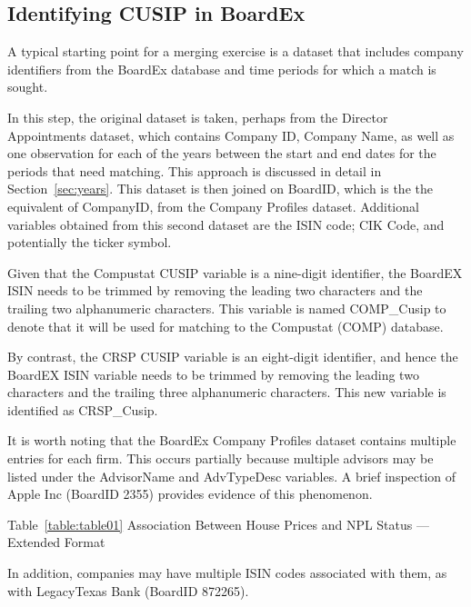 \documentclass[12pt]{article}
\begin{document}
\subsection{Identifying CUSIP in BoardEx}\label{sec:BECUSIP}

A typical starting point for a merging exercise is a dataset that includes company identifiers from the BoardEx database and time periods for which a match is sought.

In this step, the original dataset is taken, perhaps from the Director Appointments dataset, which contains Company ID, Company Name, as well as one observation for each of the years between the start and end dates for the periods that need matching.
This approach is discussed in detail in Section~\ref{sec:years}.
This dataset is then joined on BoardID, which is the the equivalent of CompanyID, from the Company Profiles dataset.
Additional variables obtained from this second dataset are the ISIN code; CIK Code, and potentially the ticker symbol.

Given that the Compustat CUSIP variable is a nine-digit identifier, the BoardEX ISIN needs to be trimmed by removing the leading two characters and the trailing two alphanumeric characters.
This variable is named COMP\_Cusip to denote that it will be used for matching to the Compustat (COMP) database.

By contrast, the CRSP CUSIP variable is an eight-digit identifier, and hence the BoardEX ISIN variable needs to be trimmed by removing the leading two characters and the trailing three alphanumeric characters.
This new variable is identified as CRSP\_Cusip.

It is worth noting that the BoardEx Company Profiles dataset contains multiple entries for each firm.
This occurs partially because multiple advisors may be listed under the AdvisorName and AdvTypeDesc variables.
A brief inspection of Apple Inc (BoardID 2355) provides evidence of this phenomenon.

\begin{center}
Table~\ref{table:table01} Association Between House Prices and NPL Status --- Extended Format\label{table:table01}

\end{center}

In addition, companies may have multiple ISIN codes associated with them, as with LegacyTexas Bank (BoardID 872265).

\begin{center}

\end{center}
\end{document}
